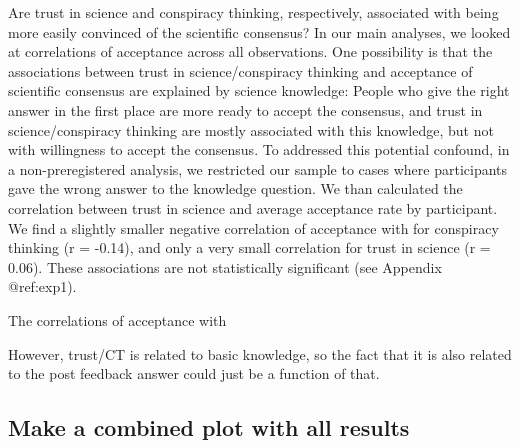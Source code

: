 \documentclass[
  doc,floatsintext]{apa6}
\begin{document}
Are trust in science and conspiracy thinking, respectively, associated with being more easily convinced of the scientific consensus? In our main analyses, we looked at correlations of acceptance across all observations. One possibility is that the associations between trust in science/conspiracy thinking and acceptance of scientific consensus are explained by science knowledge: People who give the right answer in the first place are more ready to accept the consensus, and trust in science/conspiracy thinking are mostly associated with this knowledge, but not with willingness to accept the consensus. To addressed this potential confound, in a non-preregistered analysis, we restricted our sample to cases where participants gave the wrong answer to the knowledge question. We than calculated the correlation between trust in science and average acceptance rate by participant. We find a slightly smaller negative correlation of acceptance with for conspiracy thinking (r = -0.14), and only a very small correlation for trust in science (r = 0.06). These associations are not statistically significant (see Appendix @ref:exp1).

The correlations of acceptance with

However, trust/CT is related to basic knowledge, so the fact that it is also related to the post feedback answer could just be a function of that.

\hypertarget{make-a-combined-plot-with-all-results}{%
\subsection{Make a combined plot with all results}\label{make-a-combined-plot-with-all-results}}
\end{document}
